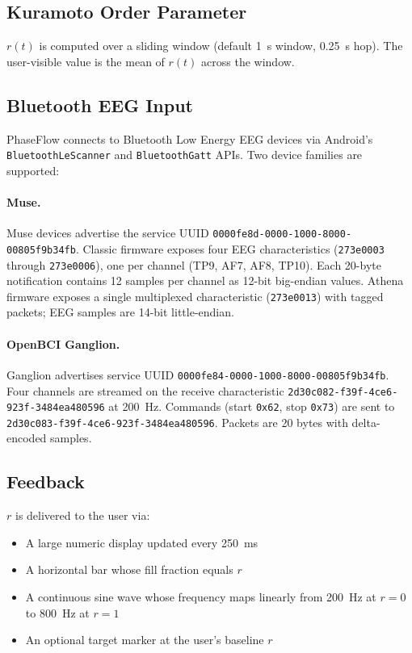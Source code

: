 \documentclass[11pt,a4paper]{article}
\begin{document}
\subsection{Kuramoto Order Parameter}

$r(t)$ is computed over a sliding window (default 1~s window, 0.25~s hop). The user-visible value is the mean of $r(t)$ across the window.

\subsection{Bluetooth EEG Input}

PhaseFlow connects to Bluetooth Low Energy EEG devices via Android's \texttt{BluetoothLeScanner} and \texttt{BluetoothGatt} APIs. Two device families are supported:

\paragraph{Muse.} Muse devices advertise the service UUID \texttt{0000fe8d-0000-1000-8000-00805f9b34fb}. Classic firmware exposes four EEG characteristics (\texttt{273e0003} through \texttt{273e0006}), one per channel (TP9, AF7, AF8, TP10). Each 20-byte notification contains 12 samples per channel as 12-bit big-endian values. Athena firmware exposes a single multiplexed characteristic (\texttt{273e0013}) with tagged packets; EEG samples are 14-bit little-endian.

\paragraph{OpenBCI Ganglion.} Ganglion advertises service UUID \texttt{0000fe84-0000-1000-8000-00805f9b34fb}. Four channels are streamed on the receive characteristic \texttt{2d30c082-f39f-4ce6-923f-3484ea480596} at 200~Hz. Commands (start \texttt{0x62}, stop \texttt{0x73}) are sent to \texttt{2d30c083-f39f-4ce6-923f-3484ea480596}. Packets are 20 bytes with delta-encoded samples.

\subsection{Feedback}

$r$ is delivered to the user via:
\begin{itemize}
\item A large numeric display updated every 250~ms
\item A horizontal bar whose fill fraction equals $r$
\item A continuous sine wave whose frequency maps linearly from 200~Hz at $r = 0$ to 800~Hz at $r = 1$
\item An optional target marker at the user's baseline $r$
\end{itemize}
\end{document}
